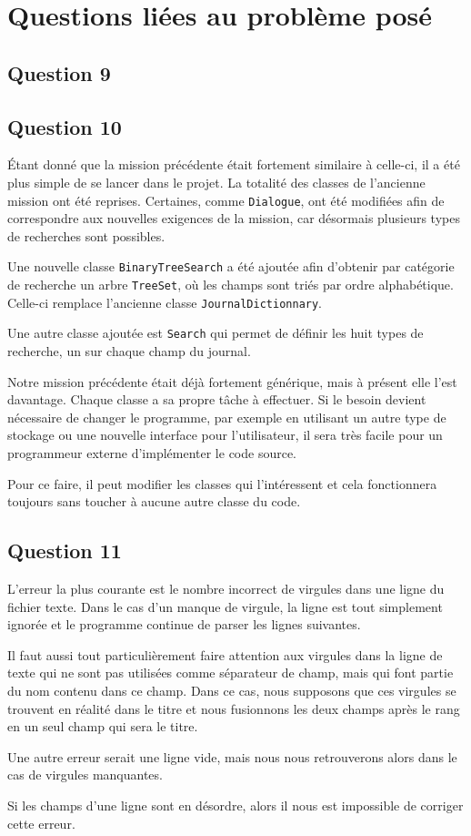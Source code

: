 \documentclass[11pt]{article}
\begin{document}
\section{Questions liées au problème posé}
\subsection*{Question 9}

\subsection*{Question 10}
Étant donné que la mission précédente était fortement similaire à celle-ci, il a été plus simple de se lancer dans le projet. 
La totalité des classes de l'ancienne mission ont été reprises. Certaines, comme \verb+Dialogue+, ont été modifiées afin de correspondre aux nouvelles exigences de la mission, car désormais plusieurs types de recherches sont possibles. 

Une nouvelle classe \verb+BinaryTreeSearch+ a été ajoutée afin d'obtenir par catégorie de recherche un arbre \verb+TreeSet+, où les champs sont triés par ordre alphabétique. Celle-ci remplace l'ancienne classe \verb+JournalDictionnary+.

Une autre classe ajoutée est \verb+Search+ qui permet de définir les huit types de recherche, un sur chaque champ du journal.

Notre mission précédente était déjà fortement générique, mais à présent elle l'est davantage. Chaque classe a sa propre tâche à effectuer. Si le besoin devient nécessaire de changer le programme, par exemple en utilisant un autre type de stockage ou une nouvelle interface pour l'utilisateur, il sera très facile pour un programmeur externe d'implémenter le code source.

Pour ce faire, il peut modifier les classes qui l'intéressent et cela fonctionnera toujours sans toucher à aucune autre classe du code.

\subsection*{Question 11}

L'erreur la plus courante est le nombre incorrect de virgules dans une ligne du fichier texte. Dans le cas d'un manque de virgule, la ligne est tout simplement ignorée et le programme continue de parser les lignes suivantes.

Il faut aussi tout particulièrement faire attention aux virgules dans la ligne de texte qui ne sont pas utilisées comme séparateur de champ, mais qui font partie du nom contenu dans ce champ.
Dans ce cas, nous supposons que ces virgules se trouvent en réalité dans le titre et nous fusionnons les deux champs après le rang en un seul champ qui sera le titre.

Une autre erreur serait une ligne vide, mais nous nous retrouverons alors dans le cas de virgules manquantes.

Si les champs d'une ligne sont en désordre, alors il nous est impossible de corriger cette erreur.
\end{document}
